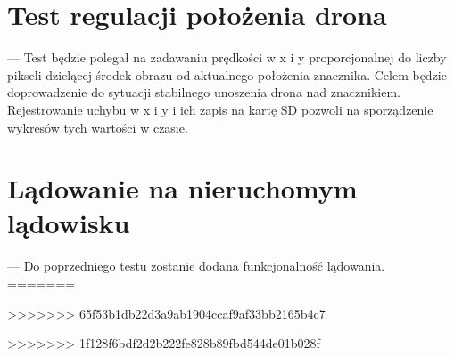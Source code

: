 \section{Test regulacji położenia drona}
\label{sec:test_regulacji_polozenia_drona}
--- Test będzie polegał na zadawaniu prędkości w x i y proporcjonalnej do liczby pikseli dzielącej środek obrazu od aktualnego położenia znacznika. Celem będzie doprowadzenie do sytuacji stabilnego unoszenia drona nad znacznikiem. Rejestrowanie uchybu w x i y i ich zapis na kartę SD pozwoli na sporządzenie wykresów tych wartości w czasie.
\section{Lądowanie na nieruchomym lądowisku}
\label{sec:ladowanie_na_nieruchomym_ladowisku}
--- Do poprzedniego testu zostanie dodana funkcjonalność lądowania.
=======

>>>>>>> 65f53b1db22d3a9ab1904ccaf9af33bb2165b4c7


>>>>>>> 1f128f6bdf2d2b222fe828b89fbd544de01b028f
